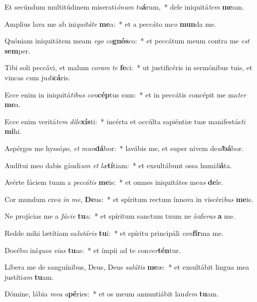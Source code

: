 \item Et secúndum multitúdinem miserati\textit{ó}\textit{num} \textit{tu}\textbf{á}rum,~* dele iniquitá\textit{tem} \textbf{me}am.
\item Amplius lava me ab ini\textit{qui}\textit{tá}\textit{te} \textbf{me}a:~* et a peccáto me\textit{o} \textbf{mun}da me.
\item Quóniam iniquitátem meam \textit{e}\textit{go} \textit{co}\textbf{gnós}co:~* et peccátum meum contra me \textit{est} \textbf{sem}per.
\item Tibi soli peccávi, et malum \textit{co}\textit{ram} \textit{te} \textbf{fe}ci:~* ut justificéris in sermónibus tuis, et vincas cum ju\textit{di}\textbf{cá}ris.
\item Ecce enim in iniquitá\textit{ti}\textit{bus} \textit{con}\textbf{cép}tus sum:~* et in peccátis concépit me ma\textit{ter} \textbf{me}a.
\item Ecce enim veritá\textit{tem} \textit{di}\textit{le}\textbf{xís}ti:~* incérta et occúlta sapiéntiæ tuæ manifestás\textit{ti} \textbf{mi}hi.
\item Aspérges me hyssó\textit{po}, \textit{et} \textit{mun}\textbf{dá}bor:~* lavábis me, et super nivem de\textit{al}\textbf{bá}bor.
\item Audítui meo dabis gáudi\textit{um} \textit{et} \textit{læ}\textbf{tí}tiam:~* et exsultábunt ossa humi\textit{li}\textbf{á}ta.
\item Avérte fáciem tuam a \textit{pec}\textit{cá}\textit{tis} \textbf{me}is:~* et omnes iniquitátes me\textit{as} \textbf{de}le.
\item Cor mundum cre\textit{a} \textit{in} \textit{me}, \textbf{De}us:~* et spíritum rectum ínnova in viscéri\textit{bus} \textbf{me}is.
\item Ne projícias me a \textit{fá}\textit{ci}\textit{e} \textbf{tu}a:~* et spíritum sanctum tuum ne áufe\textit{ras} \textbf{a} me.
\item Redde mihi lætítiam sa\textit{lu}\textit{tá}\textit{ris} \textbf{tu}i:~* et spíritu principáli \textit{con}\textbf{fír}ma me.
\item Docébo iní\textit{quos} \textit{vi}\textit{as} \textbf{tu}as:~* et ímpii ad te con\textit{ver}\textbf{tén}tur.
\item Líbera me de sanguínibus, Deus, Deus \textit{sa}\textit{lú}\textit{tis} \textbf{me}æ:~* et exsultábit lingua mea justíti\textit{am} \textbf{tu}am.
\item Dómine, lábia \textit{me}\textit{a} \textit{a}\textbf{pé}ries:~* et os meum annuntiábit lau\textit{dem} \textbf{tu}am.
